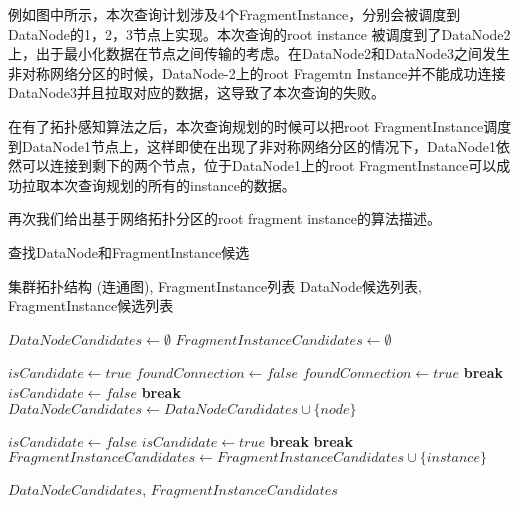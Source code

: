 例如图中所示，本次查询计划涉及4个FragmentInstance，分别会被调度到DataNode的1，2，3节点上实现。本次查询的root instance 被调度到了DataNode2上，出于最小化数据在节点之间传输的考虑。在DataNode2和DataNode3之间发生非对称网络分区的时候，DataNode-2上的root Fragemtn Instance并不能成功连接DataNode3并且拉取对应的数据，这导致了本次查询的失败。

在有了拓扑感知算法之后，本次查询规划的时候可以把root FragmentInstance调度到DataNode1节点上，这样即使在出现了非对称网络分区的情况下，DataNode1依然可以连接到剩下的两个节点，位于DataNode1上的root FragmentInstance可以成功拉取本次查询规划的所有的instance的数据。

再次我们给出基于网络拓扑分区的root fragment instance的算法描述。
\begin{algorithm}
  \caption{查找DataNode和FragmentInstance候选}
  \label{alg:find_candidates}
  \begin{algorithmic}
  \REQUIRE 集群拓扑结构 (连通图), FragmentInstance列表
  \ENSURE DataNode候选列表, FragmentInstance候选列表
  
  \STATE $DataNodeCandidates \leftarrow \emptyset$
  \STATE $FragmentInstanceCandidates \leftarrow \emptyset$
  
      \STATE $isCandidate \leftarrow true$
          \STATE $foundConnection \leftarrow false$
                  \STATE $foundConnection \leftarrow true$
                  \STATE \textbf{break} 
              \ENDIF
          \ENDFOR
              \STATE $isCandidate \leftarrow false$
              \STATE \textbf{break} 
          \ENDIF
      \ENDFOR
          \STATE $DataNodeCandidates \leftarrow DataNodeCandidates \cup \{node\}$
      \ENDIF
  \ENDFOR
  
      \STATE $isCandidate \leftarrow false$
                  \STATE $isCandidate \leftarrow true$
                  \STATE \textbf{break} 
              \ENDIF
          \ENDFOR
              \STATE \textbf{break} 
          \ENDIF
      \ENDFOR
          \STATE $FragmentInstanceCandidates \leftarrow FragmentInstanceCandidates \cup \{instance\}$
      \ENDIF
  \ENDFOR
  
  \RETURN $DataNodeCandidates$, $FragmentInstanceCandidates$
  \end{algorithmic}
  \end{algorithm}

